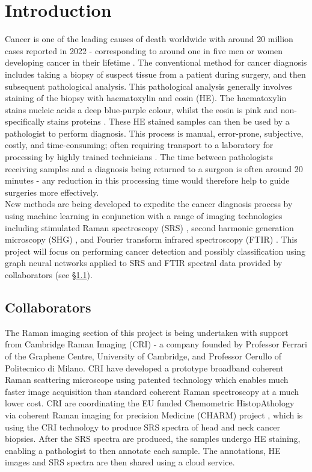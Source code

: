 \section{Introduction} %
\noindent
Cancer is one of the leading causes of death worldwide with around 20 million cases reported in 2022 - corresponding to around one in five men or women developing cancer in their lifetime \cite{bray_global_2024}. The conventional method for cancer diagnosis includes taking a biopsy of suspect tissue from a patient during surgery, and then subsequent pathological analysis. This pathological analysis generally involves staining of the biopsy with haematoxylin and eosin (HE). The haematoxylin stains nucleic acids a deep blue-purple colour, whilst the eosin is pink and non-specifically stains proteins \cite{fischer_hematoxylin_2008}. These HE stained samples can then be used by a pathologist to perform diagnosis. This process is manual, error-prone, subjective, costly, and time-consuming; often requiring transport to a laboratory for processing by highly trained technicians \cite{hollon_near_2020}. The time between pathologists receiving samples and a diagnosis being returned to a surgeon is often around 20 minutes \cite{novis_interinstitutional_1997} - any reduction in this processing time would therefore help to guide surgeries more effectively.\\

New methods are being developed to expedite the cancer diagnosis process by using machine learning in conjunction with a range of imaging technologies including stimulated Raman spectroscopy (SRS) \cite{hollon_near_2020, sarri_fast_2019, kondepudi_foundation_2024, jiang_opensrh_2022}, second harmonic generation microscopy (SHG) \cite{sarri_fast_2019}, and Fourier transform infrared spectroscopy (FTIR) \cite{tomas_detection_2022, berisha_deep_2019}. This project will focus on performing cancer detection and possibly classification using graph neural networks applied to SRS and FTIR spectral data provided by collaborators (see §\ref{sec:colab}).
\subsection{Collaborators} \label{sec:colab}
\noindent
The Raman imaging section of this project is being undertaken with support from Cambridge Raman Imaging (CRI) - a company founded by Professor Ferrari of the Graphene Centre, University of Cambridge, and Professor Cerullo of Politecnico di Milano. CRI have developed a prototype broadband coherent Raman scattering microscope using patented technology which enables much faster image acquisition than standard coherent Raman spectroscopy at a much lower cost. CRI are coordinating the EU funded Chemometric HistopAthology via coherent Raman imaging for precision Medicine (CHARM) project \cite{noauthor_home_2022}, which is using the CRI technology to produce SRS spectra of head and neck cancer biopsies. After the SRS spectra are produced, the samples undergo HE staining, enabling a pathologist to then annotate each sample. The annotations, HE images and SRS spectra are then shared using a cloud service.\\

